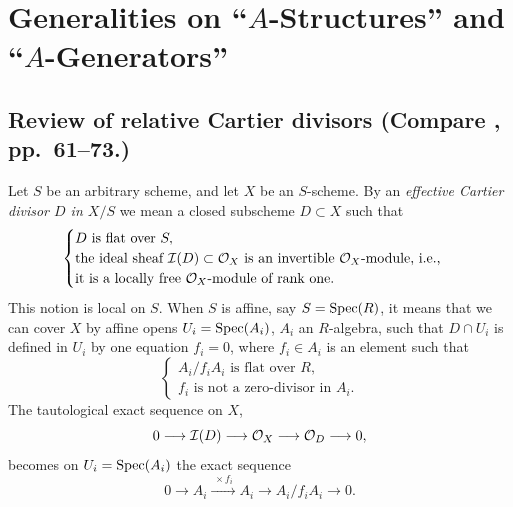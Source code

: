 \chapter{Generalities on ``$A$-Structures'' and ``$A$-Generators''}
\label{ch:1}

\section{Review of relative Cartier divisors (Compare \cite{Mum2}, pp.~61--73.)}
\label{sec:1.1}

\kmitem\label{item:1.1.1}
Let $S$ be an arbitrary scheme, and let $X$ be an $S$-scheme. By an \emph{effective Cartier divisor $D$ in $X/S$} we mean a closed subscheme $D \subset X$ such that
\begin{equation*}
\begin{cases}
D \text{ is flat over } S, \\
\text{the ideal sheaf } \mathcal{I}(D) \subset \mathcal{O}_X \text{ is an invertible } \mathcal{O}_X\text{-module, i.e.,} \\
\text{it is a locally free } \mathcal{O}_X\text{-module of rank one.}
\end{cases}
\end{equation*}
This notion is local on $S$. When $S$ is affine, say $S = \operatorname{Spec}(R)$, it means that we can cover $X$ by affine opens $U_i = \operatorname{Spec}(A_i)$, $A_i$ an $R$-algebra, such that $D \cap U_i$ is defined in $U_i$ by one equation $f_i = 0$, where $f_i \in A_i$ is an element such that
\begin{equation*}
\begin{cases}
A_i/f_i A_i \text{ is flat over } R, \\
f_i \text{ is not a zero-divisor in } A_i.
\end{cases}
\end{equation*}
The tautological exact sequence on $X$,
\[
0 \longrightarrow \mathcal{I}(D) \longrightarrow \mathcal{O}_X \longrightarrow \mathcal{O}_D \longrightarrow 0,
\]
becomes on $U_i = \operatorname{Spec}(A_i)$ the exact sequence
\[
0 \longrightarrow A_i \xrightarrow{\;\times f_i\;} A_i \longrightarrow A_i/f_i A_i \longrightarrow 0.
\]

